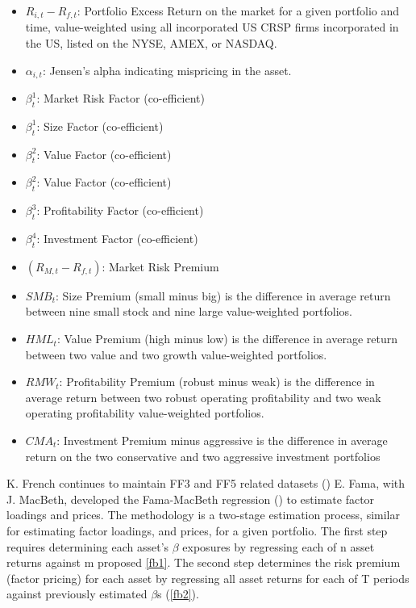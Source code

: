 \documentclass[10pt]{article}
\begin{document}
\begin{itemize} 
	\item $R_{i,t} - R_{f,t}$: Portfolio Excess Return on the market for a given portfolio and time, value-weighted using all incorporated US CRSP firms incorporated in the US, listed on the NYSE, AMEX, or NASDAQ.
	\item $\alpha_{i,t}$: Jensen's alpha indicating mispricing in the asset.
	\item $\beta_{t}^{1}$: Market Risk Factor (co-efficient)
	\item $\beta_{t}^{1}$: Size Factor (co-efficient)
	\item $\beta_{t}^{2}$: Value Factor (co-efficient)
	\item $\beta_{t}^{2}$: Value Factor (co-efficient)
	\item $\beta_{t}^{3}$: Profitability Factor (co-efficient)
	\item $\beta_{t}^{4}$: Investment Factor (co-efficient)
	\item $(R_{M,t}-R_{f,t})$: Market Risk Premium
	\item $SMB_{t}$: Size Premium (small minus big) is the difference in average return between nine small stock and nine large value-weighted portfolios.
	\item $HML_{t}$: Value Premium (high minus low) is the difference in average return between two value and two growth value-weighted portfolios.
	\item $RMW_{t}$: Profitability Premium (robust minus weak) is the difference in average return between two robust operating profitability and two weak operating profitability value-weighted portfolios.
	\item $CMA_{t}$: Investment Premium minus aggressive is the difference in average return on the two conservative and two aggressive investment portfolios
\end{itemize}
K. French continues to maintain FF3 and FF5 related datasets (\cite{french-personal})
E. Fama, with J. MacBeth, developed the Fama-MacBeth regression (\cite{fama1973risk}) to estimate factor loadings and prices.
The methodology is a two-stage estimation process, similar for estimating factor loadings, and prices, for a given portfolio.
The first step requires determining each asset's $\beta$ exposures by regressing each of n asset returns against m proposed \ref{fb1}.
The second step determines the risk premium (factor pricing) for each asset by regressing all asset returns for each of T periods against previously estimated $\beta$s (\ref{fb2}).
\end{document}
